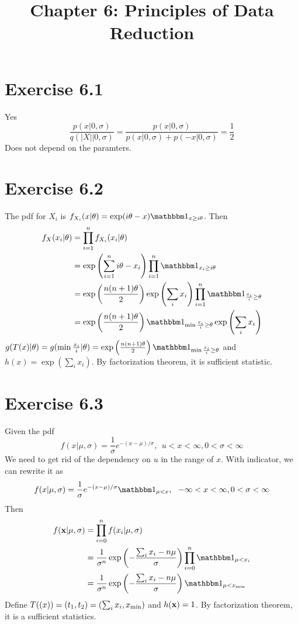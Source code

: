\documentclass[12pt]{article}
\title{Chapter 6: Principles of Data Reduction}
\begin{document}
\maketitle

\section*{Exercise 6.1}
Yes
$$
 \frac{p(x|0,\sigma)}{q(|X| | 0, \sigma)} = \frac{p(x|0,\sigma)}{p(x| 0, \sigma) + p(-x|0, \sigma)} = \frac{1}{2}
$$
Does not depend on the paramters.

\section*{Exercise 6.2}
The pdf for $X_i$ is $f_{X_i}(x|\theta) = \exp(i\theta - x)\one_{x\geq i\theta}$. Then 
$$\begin{aligned}
   f_X(x_i|\theta) &= \prod_{i=1}^n f_{X_i}(x_i|\theta) \\
    	&=  \exp\left(\sum_{i=1}^n i\theta - x_i\right) \prod_{i=1}^n \one_{x_i \geq i\theta} \\ 
    	&=  \exp\left(\frac{n(n+1)\theta}{2}\right) \exp\left(\sum_i x_i\right)  \prod_{i=1}^n \one_{\frac{x_i}{i} \geq \theta} \\
    	&=  \exp\left(\frac{n(n+1)\theta}{2}\right)   \one_{\min \frac{x_i}{i} \geq \theta}  \exp\left(\sum_i x_i\right)
\end{aligned}
$$
$g(T(x)|\theta) = g(\min \frac{x_i}{i}|\theta) =  \exp\left(\frac{n(n+1)\theta}{2}\right)   \one_{\min \frac{x_i}{i} \geq \theta}$ and $h(x) = \exp\left(\sum_i x_i\right)$. By factorization theorem, it is sufficient statistic.

\section*{Exercise 6.3}
Given the pdf 
$$ f(x | \mu, \sigma) = \frac{1}{\sigma} e^{-(x-\mu)/\sigma}, \ \ u<x <\infty, 0 < \sigma < \infty$$
We need to get rid of the dependency on $u$ in the range of $x$. With indicator, we can rewrite it as
$$ f(x | \mu, \sigma) = \frac{1}{\sigma} e^{-(x-\mu)/\sigma}\one_{\mu < x}, \ \ -\infty <x <\infty, 0 < \sigma < \infty$$
Then $$
\begin{aligned}
	f(\vb{x} | \mu, \sigma) &= \prod^n_{i=0} 	f(x_i | \mu, \sigma) \\
		&= \frac{1}{\sigma^n} \exp\left(-\frac{\sum_i{x_i} - n\mu}{\sigma}\right)   \prod^n_{i=0} \one_{\mu < x_i} \\
		&= \frac{1}{\sigma^n} \exp\left(-\frac{\sum_i{x_i} - n\mu}{\sigma}\right)   \one_{\mu <  x_{\min}}
\end{aligned}
$$
Define $T(\boldmath(x)) = (t_1, t_2) = (\sum_i x_i, x_{\min})$ and $h(\vb{x}) = 1$. By factorization theorem, it is a sufficient statistics.
\end{document}

